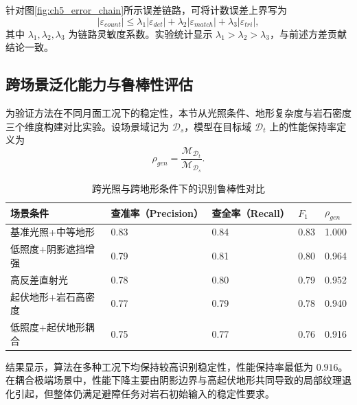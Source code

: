 \documentclass[UTF8,zihao=-4,a4paper,oneside,openany]{ctexrep}
\numberwithin{equation}{chapter}
\renewcommand{\small}{\normalsize}
\renewcommand{\small}{\normalsize}
\theoremstyle{plain}
\theoremstyle{definition}
\begin{document}
针对图\ref{fig:ch5_error_chain}所示误差链路，可将计数误差上界写为
\begin{equation}
|\varepsilon_{count}|\le
\lambda_1|\varepsilon_{det}|+
\lambda_2|\varepsilon_{match}|+
\lambda_3|\varepsilon_{tri}|,
\label{eq:ch5_count_error_bound}
\end{equation}
其中 $\lambda_1,\lambda_2,\lambda_3$ 为链路灵敏度系数。实验统计显示 $\lambda_1>\lambda_2>\lambda_3$，与前述方差贡献结论一致。

\subsection{跨场景泛化能力与鲁棒性评估}
\label{subsec:ch5_generalization}

为验证方法在不同月面工况下的稳定性，本节从光照条件、地形复杂度与岩石密度三个维度构建对比实验。设场景域记为 $\mathcal{D}_s$，模型在目标域 $\mathcal{D}_t$ 上的性能保持率定义为
\begin{equation}
\rho_{gen}=\frac{\mathcal{M}_{\mathcal{D}_t}}{\mathcal{M}_{\mathcal{D}_s}}.
\label{eq:ch5_generalization_ratio}
\end{equation}

\begin{table}[H]
	\centering
	\small
	\caption{跨光照与跨地形条件下的识别鲁棒性对比}
	\label{tab:ch5_cross_scene}
	\begin{tabular}{p{}p{}p{}p{}p{}}
		\toprule
		场景条件 & 查准率（Precision） & 查全率（Recall） & $F_1$ & $\rho_{gen}$ \\
		\midrule
		基准光照+中等地形 & 0.83 & 0.84 & 0.83 & 1.000 \\
		低照度+阴影遮挡增强 & 0.79 & 0.81 & 0.80 & 0.964 \\
		高反差直射光 & 0.78 & 0.80 & 0.79 & 0.952 \\
		起伏地形+岩石高密度 & 0.77 & 0.79 & 0.78 & 0.940 \\
		低照度+起伏地形耦合 & 0.75 & 0.77 & 0.76 & 0.916 \\
		\bottomrule
	\end{tabular}
\end{table}

结果显示，算法在多种工况下均保持较高识别稳定性，性能保持率最低为 $0.916$。在耦合极端场景中，性能下降主要由阴影边界与高起伏地形共同导致的局部纹理退化引起，但整体仍满足避障任务对岩石初始输入的稳定性要求。
\end{document}
